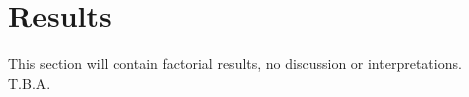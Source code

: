 \documentclass[../main.tex]{subfiles}
\begin{document}
    \section{Results}\label{sec:results}
    This section will contain factorial results, no discussion or interpretations.
    \\
    T.B.A. %
\end{document}
